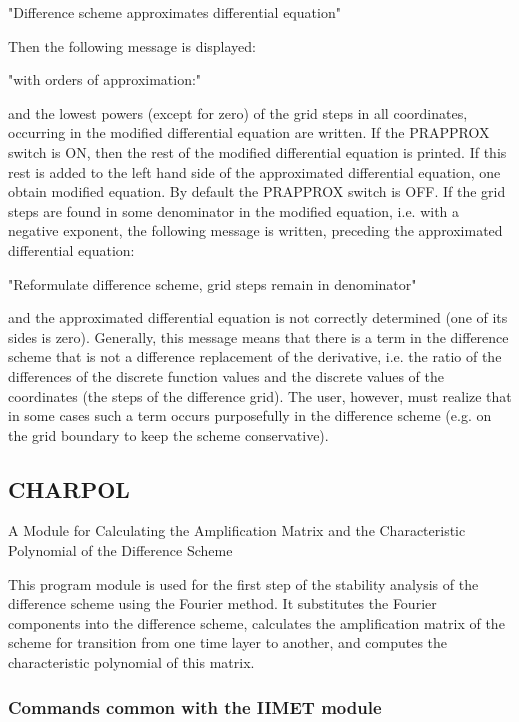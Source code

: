   "Difference scheme approximates differential equation"

Then the following message is displayed:

  "with orders of approximation:"

and the lowest powers  (except  for  zero)  of  the  grid  steps  in all
coordinates,  occurring   in  the  modified  differential  equation  are
written. If the PRAPPROX  switch is  ON, then  the rest  of the modified
differential equation is printed. If this rest is added to the left hand
side of the  approximated  differential  equation,  one  obtain modified
equation. By  default the  PRAPPROX switch is OFF. If the grid steps are
found in some denominator in the modified equation, i.e. with a negative
exponent, the  following message  is written, preceding the approximated
differential equation:

  "Reformulate difference scheme, grid steps remain in denominator"

and the approximated differential  equation is  not correctly determined
(one of  its sides is zero). Generally, this message means that there is
a term in the difference scheme that is not a  difference replacement of
the  derivative,  i.e.  the  ratio  of  the  differences of the discrete
function values and the discrete values of the coordinates (the steps of
the difference grid). The user, however, must realize that in some cases
such a term occurs purposefully in  the difference  scheme (e.g.  on the
grid boundary to keep the scheme conservative).


\subsection{CHARPOL}



           A Module for Calculating the Amplification Matrix
               and the Characteristic Polynomial of the
                           Difference Scheme



     This program  module is  used for  the first  step of the stability
analysis  of  the  difference  scheme  using  the  Fourier   method.  It
substitutes   the   Fourier   components  into  the  difference  scheme,
calculates the amplification matrix  of the  scheme for  transition from
one time layer to another, and computes the characteristic polynomial of
this matrix.


\subsubsection{Commands common with the IIMET module}


